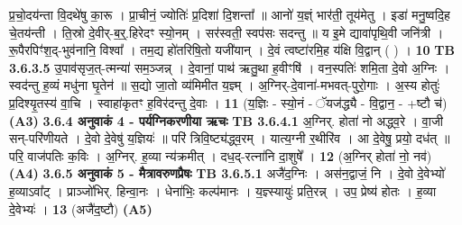 \documentclass[17pt]{extarticle}
\begin{document}
{{{{{{{{{{{{{{{{{{{                  प्र॒चो॒दय॑न्ता वि॒दथे॑षु का॒रू । प्रा॒चीनं॒ ज्योतिः॑ प्र॒दिशा॑ दि॒शन्ता᳚ ॥ आनो॑ य॒ज्ञ्ं भार॑ती॒ तूय॑मेतु । इडा॑ मनु॒ष्वदि॒ह चे॒तय॑न्ती । ति॒स्रो दे॒वीर्-ब॒र्॒.हिरेदꣳ स्यो॒नम् । सर॑स्वती॒ स्वप॑सः सदन्तु ॥ य इ॒मे द्यावा॑पृथि॒वी जनि॑त्री । रू॒पैरपिꣳ॑श॒द्-भुव॑नानि॒ विश्वा᳚ । तम॒द्य हो॑तरिषि॒तो यजी॑यान् । दे॒वं त्वष्टा॑रमि॒ह य॑क्षि वि॒द्वान् ( ) । \textbf{ 10} \newline
                  \newline
                                \textbf{ TB 3.6.3.5} \newline
                  उ॒पाव॑सृज॒त्-त्मन्या॑ सम॒ञ्जन्न् । दे॒वानां॒ पाथ॑ ऋतु॒था ह॒वीꣳषि॑ । वन॒स्पतिः॑ शमि॒ता दे॒वो अ॒ग्निः । स्वद॑न्तु ह॒व्यं मधु॑ना घृ॒तेन॑ ॥ स॒द्यो जा॒तो व्य॑मिमीत य॒ज्ञ्म् । अ॒ग्निर्-दे॒वाना॑-मभवत्-पुरो॒गाः । अ॒स्य होतुः॑ प्र॒दिश्यृ॒तस्य॑ वा॒चि । स्वाहा॑कृतꣳ ह॒विर॑दन्तु दे॒वाः । \textbf{ 11} \newline
                  \newline
                                    (य॒ज्ञिः - स्यो॒नं - ॅयज॑द्ध्यै - वि॒द्वान॒ - +ष्टौ च॑) \textbf{(A3)} \newline \newline
                \textbf{ 3.6.4     अनुवाकं   4 - पर्यग्निकरणीया ऋचः} \newline
                                \textbf{ TB 3.6.4.1} \newline
                  अ॒ग्निर्. होता॑ नो अद्ध्व॒रे । वा॒जी सन्-परि॑णीयते । दे॒वो दे॒वेषु॑ य॒ज्ञियः॑ ॥ परि॑ त्रिवि॒ष्ट्य॑द्ध्व॒रम् । यात्य॒ग्नी र॒थीरि॑व । आ दे॒वेषु॒ प्रयो॒ दध॑त् ॥ परि॒ वाज॑पतिः क॒विः । अ॒ग्निर्. ह॒व्या न्य॑क्रमीत् । दध॒द्-रत्ना॑नि दा॒शुषे᳚ । \textbf{ 12} \newline
                  \newline
                                    (अ॒ग्निर् होता॑ नो॒ नव॑) \textbf{(A4)} \newline \newline
                \textbf{ 3.6.5     अनुवाकं   5 - मैत्रावरुणप्रैषः} \newline
                                \textbf{ TB 3.6.5.1} \newline
                  अजै॑द॒ग्निः । अस॑न॒द्वाजं॒ नि । दे॒वो दे॒वेभ्यो॑ ह॒व्याऽवा᳚ट् । प्राञ्जो॑भिर्. हिन्वा॒नः । धेना॑भिः॒ कल्प॑मानः । य॒ज्ञ्स्यायुः॑ प्रति॒रन्न् । उप॒ प्रेष्य॑ होतः । ह॒व्या दे॒वेभ्यः॑ । \textbf{ 13} \newline
                  \newline
                                    (अजै॑द॒ष्टौ) \textbf{(A5)} \newline \newline
}}}}}}}}}}}}}}}}}}}
\end{document}
